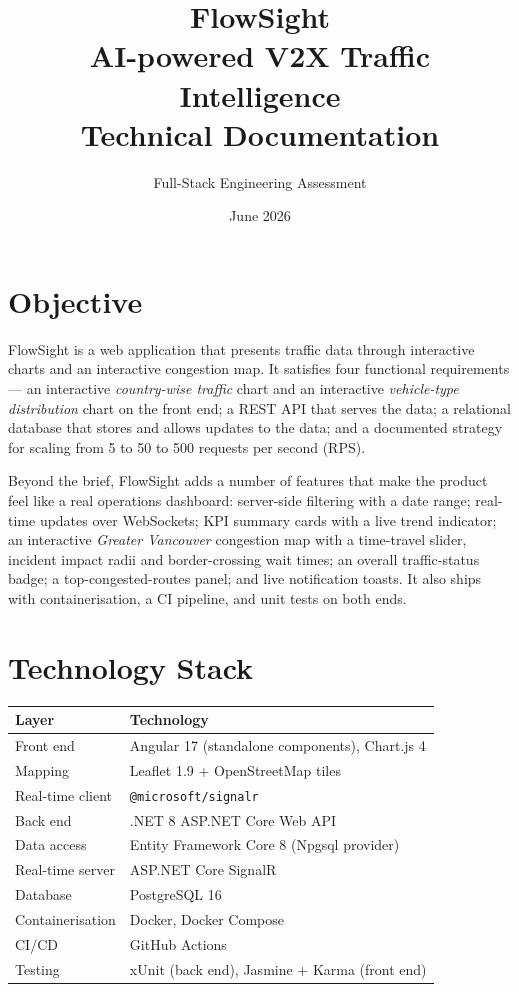 \documentclass[11pt,a4paper]{article}
\title{\textbf{FlowSight}\\[2mm]
  \large AI-powered V2X Traffic Intelligence\\[1mm]
  \normalsize Technical Documentation}
\author{Full-Stack Engineering Assessment}
\date{June 2026}
\newcommand{\code}[1]{\texttt{\small #1}}
\begin{document}
\maketitle
\tableofcontents
\newpage

\section{Objective}
FlowSight is a web application that presents traffic data through interactive
charts and an interactive congestion map. It satisfies four functional
requirements --- an interactive \emph{country-wise traffic} chart and an
interactive \emph{vehicle-type distribution} chart on the front end; a REST API
that serves the data; a relational database that stores and allows updates to
the data; and a documented strategy for scaling from 5 to 50 to 500 requests per
second (RPS).

Beyond the brief, FlowSight adds a number of features that make the product feel
like a real operations dashboard: server-side filtering with a date range;
real-time updates over WebSockets; KPI summary cards with a live trend
indicator; an interactive \emph{Greater Vancouver} congestion map with a
time-travel slider, incident impact radii and border-crossing wait times; an
overall traffic-status badge; a top-congested-routes panel; and live
notification toasts. It also ships with containerisation, a CI pipeline, and
unit tests on both ends.

\section{Technology Stack}
\begin{center}
\begin{tabular}{@{}ll@{}}
\toprule
\textbf{Layer} & \textbf{Technology} \\
\midrule
Front end        & Angular 17 (standalone components), Chart.js 4 \\
Mapping          & Leaflet 1.9 + OpenStreetMap tiles \\
Real-time client & \code{@microsoft/signalr} \\
Back end         & .NET 8 ASP.NET Core Web API \\
Data access      & Entity Framework Core 8 (Npgsql provider) \\
Real-time server & ASP.NET Core SignalR \\
Database         & PostgreSQL 16 \\
Containerisation & Docker, Docker Compose \\
CI/CD            & GitHub Actions \\
Testing          & xUnit (back end), Jasmine + Karma (front end) \\
\bottomrule
\end{tabular}
\end{center}
\end{document}
